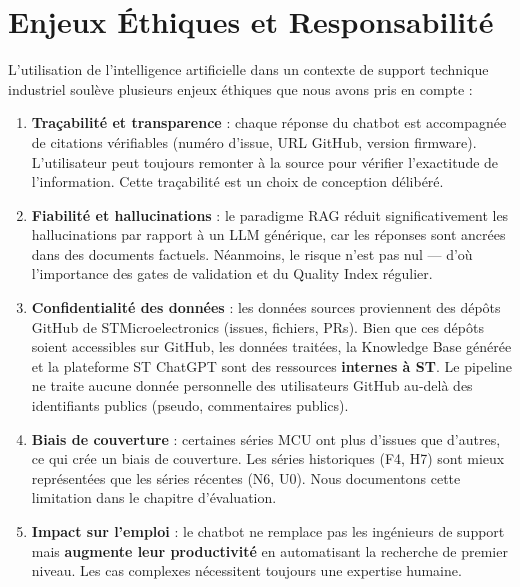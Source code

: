 \documentclass[12pt,a4paper]{report}
\begin{document}
\section{Enjeux Éthiques et Responsabilité}
\label{sec:enjeux_ethiques}

L'utilisation de l'intelligence artificielle dans un contexte de support technique industriel soulève plusieurs enjeux éthiques que nous avons pris en compte :

\begin{enumerate}
  \item \textbf{Traçabilité et transparence} : chaque réponse du chatbot est accompagnée de citations vérifiables (numéro d'issue, URL GitHub, version firmware). L'utilisateur peut toujours remonter à la source pour vérifier l'exactitude de l'information. Cette traçabilité est un choix de conception délibéré.
  
  \item \textbf{Fiabilité et hallucinations} : le paradigme RAG réduit significativement les hallucinations par rapport à un LLM générique, car les réponses sont ancrées dans des documents factuels. Néanmoins, le risque n'est pas nul --- d'où l'importance des gates de validation et du Quality Index régulier.
  
  \item \textbf{Confidentialité des données} : les données sources proviennent des dépôts GitHub de STMicroelectronics (issues, fichiers, PRs). Bien que ces dépôts soient accessibles sur GitHub, les données traitées, la Knowledge Base générée et la plateforme ST ChatGPT sont des ressources \textbf{internes à ST}. Le pipeline ne traite aucune donnée personnelle des utilisateurs GitHub au-delà des identifiants publics (pseudo, commentaires publics).
  
  \item \textbf{Biais de couverture} : certaines séries MCU ont plus d'issues que d'autres, ce qui crée un biais de couverture. Les séries historiques (F4, H7) sont mieux représentées que les séries récentes (N6, U0). Nous documentons cette limitation dans le chapitre d'évaluation.
  
  \item \textbf{Impact sur l'emploi} : le chatbot ne remplace pas les ingénieurs de support mais \textbf{augmente leur productivité} en automatisant la recherche de premier niveau. Les cas complexes nécessitent toujours une expertise humaine.
\end{enumerate}
\end{document}
